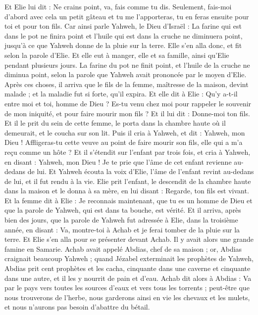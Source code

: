 \begin{multicols}{2}
Et Elie lui dit : Ne crains point, va, fais comme tu dis. Seulement, fais-moi d’abord avec cela un petit gâteau et tu me l’apporteras, tu en feras ensuite pour toi et pour ton fils.
Car ainsi parle Yahweh, le Dieu d'Israël : La farine qui est dans le pot ne finira point et l'huile qui est dans la cruche ne diminuera point, jusqu'à ce que Yahweh donne de la pluie sur la terre.
Elle s'en alla donc, et fit selon la parole d'Elie. Et elle eut à manger, elle et sa famille, ainsi qu’Elie pendant plusieurs jours.
La farine du pot ne finit point, et l'huile de la cruche ne diminua point, selon la parole que Yahweh avait prononcée par le moyen d'Elie.
Après ces choses, il arriva que le fils de la femme, maîtresse de la maison, devint malade ; et la maladie fut si forte, qu'il expira.
Et elle dit à Elie : Qu'y a-t-il entre moi et toi, homme de Dieu ? Es-tu venu chez moi pour rappeler le souvenir de mon iniquité, et pour faire mourir mon fils ?
Et il lui dit : Donne-moi ton fils. Et il le prit du sein de cette femme, le porta dans la chambre haute où il demeurait, et le coucha sur son lit.
Puis il cria à Yahweh, et dit : Yahweh, mon Dieu ! Affligeras-tu cette veuve au point de faire mourir son fils, elle qui a m’a reçu comme un hôte ?
Et il s'étendit sur l'enfant par trois fois, et cria à Yahweh, en disant : Yahweh, mon Dieu ! Je te prie que l'âme de cet enfant revienne au-dedans de lui.
Et Yahweh écouta la voix d'Elie, l'âme de l'enfant revint au-dedans de lui, et il fut rendu à la vie.
Elie prit l'enfant, le descendit de la chambre haute dans la maison et le donna à sa mère, en lui disant : Regarde, ton fils est vivant.
Et la femme dit à Elie : Je reconnais maintenant, que tu es un homme de Dieu et que la parole de Yahweh, qui est dans ta bouche, est vérité.
\VerseOne{}Et il arriva, après bien des jours, que la parole de Yahweh fut adressée à Elie, dans la troisième année, en disant : Va, montre-toi à Achab et je ferai tomber de la pluie sur la terre.
Et Elie s'en alla pour se présenter devant Achab. Il y avait alors une grande famine en Samarie.
Achab avait appelé Abdias, chef de sa maison ; or, Abdias craignait beaucoup Yahweh ;
quand Jézabel exterminait les prophètes de Yahweh, Abdias prit cent prophètes et les cacha, cinquante dans une caverne et cinquante dans une autre, et il les y nourrit de pain et d'eau.
Achab dit alors à Abdias : Va par le pays vers toutes les sources d'eaux et vers tous les torrents ; peut-être que nous trouverons de l'herbe, nous garderons ainsi en vie les chevaux et les mulets, et nous n’aurons pas besoin d’abattre du bétail.

\end{multicols}
